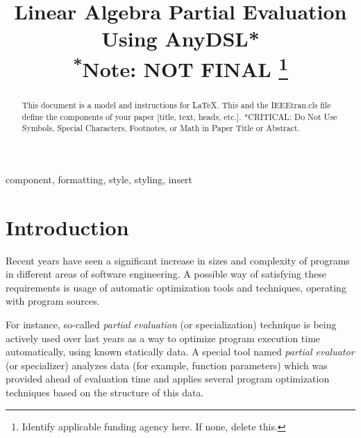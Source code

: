 \documentclass[conference]{IEEEtran}
\begin{document}
\linenumbers
\title{Linear Algebra Partial Evaluation Using AnyDSL*\\
{\footnotesize \textsuperscript{*}Note: NOT FINAL}
\thanks{Identify applicable funding agency here. If none, delete this.}
}

\author{
\and
{}
\and
{}
}
\maketitle

\begin{abstract}
This document is a model and instructions for \LaTeX.
This and the IEEEtran.cls file define the components of your paper [title, text, heads, etc.]. *CRITICAL: Do Not Use Symbols, Special Characters, Footnotes, 
or Math in Paper Title or Abstract.
\end{abstract}

\begin{IEEEkeywords}
component, formatting, style, styling, insert
\end{IEEEkeywords}

\section{Introduction}
Recent years have seen a significant increase in sizes and complexity of programs in different areas of software engineering. A possible way of satisfying these requirements is usage of automatic optimization tools and techniques, operating with program sources.

For instance, so-called \textit{partial evaluation} (or specialization) \cite{jones1993partial} technique is being actively used over last years as a way to optimize program execution time automatically, using known statically data. A special tool named \textit{partial evaluator} (or specializer) analyzes data (for example, function parameters) which was provided ahead of evaluation time and applies several program optimization techniques based on the structure of this data. 
\end{document}
